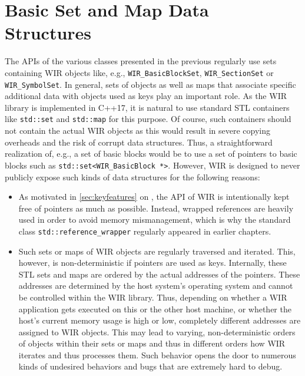 \chapter{Basic Set and Map Data Structures}
\label{chap:setsmaps}
\renewcommand{\sectiontitle}{}

The \glspl{API} of the various classes presented in the previous  regularly use sets containing \gls{WIR} objects like, e.g., \texttt{WIR\_BasicBlockSet}, \texttt{WIR\_SectionSet} or \texttt{WIR\_SymbolSet}.
In general, sets of objects as well as maps that associate specific additional data with objects used as keys play an important role.
As the \gls{WIR} library is implemented in C++17, it is natural to use standard \gls{STL} containers like \texttt{std::set} and \texttt{std::map} for this purpose.
Of course, such containers should not contain the actual \gls{WIR} objects as this would result in severe copying overheads and the risk of corrupt data structures.
Thus, a straightforward realization of, e.g., a set of basic blocks would be to use a set of pointers to basic blocks such as \texttt{std::set<WIR\_BasicBlock *>}.
However, \gls{WIR} is designed to never publicly expose such kinds of data structures for the following reasons:
\begin{itemize}
  \item As motivated in \cref{sec:keyfeatures} on , the \gls{API} of \gls{WIR} is intentionally kept free of pointers as much as possible.
  Instead, wrapped references are heavily used in order to avoid memory mismanagement, which is why the standard class \texttt{std::reference\_wrapper} regularly appeared in earlier chapters.
  \item Such sets or maps of \gls{WIR} objects are regularly traversed and iterated.
  This, however, is non-deterministic if pointers are used as keys.
  Internally, these \gls{STL} sets and maps are ordered by the actual addresses of the pointers.
  These addresses are determined by the host system's operating system and cannot be controlled within the \gls{WIR} library.
  Thus, depending on whether a \gls{WIR} application gets executed on this or the other host machine, or whether the host's current memory usage is high or low, completely different addresses are assigned to \gls{WIR} objects.
  This may lead to varying, non-deterministic orders of objects within their sets or maps and thus in different orders how \gls{WIR} iterates and thus processes them.
  Such behavior opens the door to numerous kinds of undesired behaviors and bugs that are extremely hard to debug.
\end{itemize}

